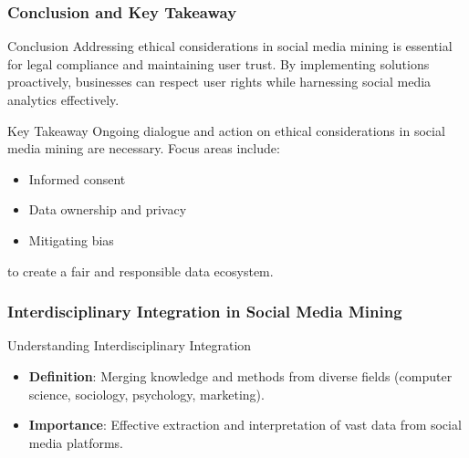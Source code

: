 \documentclass{beamer}
\begin{document}
\begin{frame}[fragile]
    \frametitle{Conclusion and Key Takeaway}
    \begin{block}{Conclusion}
        Addressing ethical considerations in social media mining is essential for legal compliance and maintaining user trust. By implementing solutions proactively, businesses can respect user rights while harnessing social media analytics effectively.
    \end{block}
    \begin{block}{Key Takeaway}
        Ongoing dialogue and action on ethical considerations in social media mining are necessary. Focus areas include:
        \begin{itemize}
            \item Informed consent
            \item Data ownership and privacy
            \item Mitigating bias
        \end{itemize}
        to create a fair and responsible data ecosystem.
    \end{block}
\end{frame}

\begin{frame}
    \frametitle{Interdisciplinary Integration in Social Media Mining}
    \begin{block}{Understanding Interdisciplinary Integration}
        \begin{itemize}
            \item \textbf{Definition}: Merging knowledge and methods from diverse fields (computer science, sociology, psychology, marketing).
            \item \textbf{Importance}: Effective extraction and interpretation of vast data from social media platforms.
        \end{itemize}
    \end{block}
\end{frame}
\end{document}

